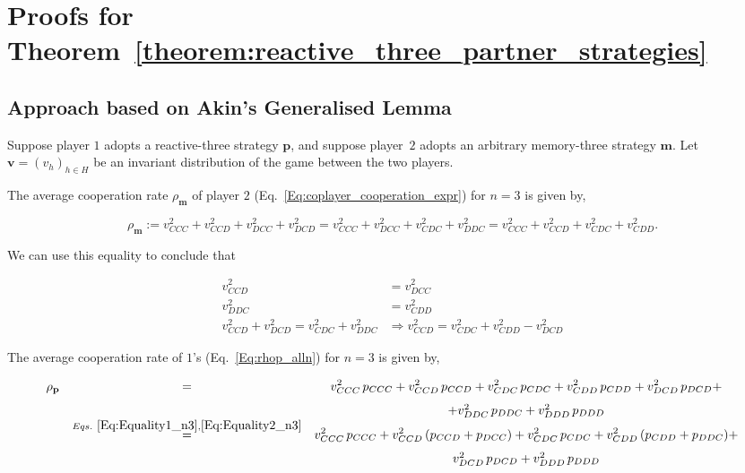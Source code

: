 \documentclass{article}
\theoremstyle{definition}
\begin{document}
\section{Proofs for Theorem~\ref{theorem:reactive_three_partner_strategies}}\label{appendix:proofs_reactive_three_partner_strategies}

\subsection{Approach based on Akin's Generalised Lemma}

Suppose player $1$ adopts a reactive-three strategy $\mathbf{p}$, and suppose
player~$2$ adopts an arbitrary memory-three strategy $\mathbf{m}$. Let
$\mathbf{v}=(v_h)_{h\in H}$ be an invariant distribution of the game between the
two players.

The average cooperation rate $\rho_\mathbf{m}$ of player $2$
(Eq.~\ref{Eq:coplayer_cooperation_expr}) for $n=3$ is given by,

\begin{equation} \label{Eq:rhoq_n3}
\rho_\mathbf{m} := v^2_{CCC} + v^2_{CCD} + v^2_{DCC} + v^2_{DCD} = v^2_{CCC} + v^2_{DCC} + v^2_{CDC} + v^2_{DDC} = v^2_{CCC} + v^2_{CCD} + v^2_{CDC} + v^2_{CDD}.
\end{equation}

We can use this equality to conclude that

\begin{align} 
  v^{2}_{CCD} & = v^{2}_{DCC} \label{Eq:Equality1_n3} \\ 
  v^{2}_{DDC} & = v^{2}_{CDD} \label{Eq:Equality2_n3} \\  
  v^{2}_{CCD} + v^{2}_{DCD}  = v^{2}_{CDC} + v^{2}_{DDC} & \Rightarrow 
  v^{2}_{CCD} = v^{2}_{CDC} + v^{2}_{CDD} - v^{2}_{DCD} \label{Eq:Equality3_n3} 
\end{align}

The average cooperation rate of $1$'s (Eq.~\eqref{Eq:rhop_alln}) for $n=3$ is given by,

\begin{equation}\label{Eq:rhop_n3}
  \begin{array}{rcc}
  \rho_\mathbf{p} & = & \displaystyle v^2_{CCC}\, p_{CCC}+ v^2_{CCD}\, p_{CCD} + v^2_{CDC}\, p_{CDC} + v^2_{CDD}\, p_{CDD} + v^2_{DCD}\, p_{DCD} +  \\ [.7em]
  & & + v^2_{DDC}\, p_{DDC} + v^2_{DDD}\, p_{DDD} \\
  & \stackrel{Eqs.~\eqref{Eq:Equality1_n3}, \eqref{Eq:Equality2_n3}}{=} & \displaystyle v^2_{CCC}\, p_{CCC}+ v^2_{CCD}\, (p_{CCD} + p_{DCC}) + v^2_{CDC}\, p_{CDC} + v^2_{CDD}\, (p_{CDD} + p_{DDC}) + \\ [.7em]
  & & v^2_{DCD}\, p_{DCD} + v^2_{DDD}\, p_{DDD}
  \end{array}
\end{equation}
 
\end{document}
